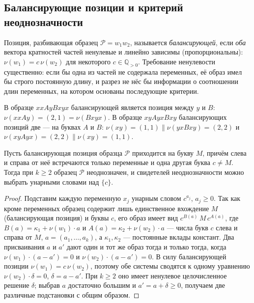 \documentclass[14pt, russian]{scrartcl}
\begin{document}
\subsection{Балансирующие позиции и критерий неоднозначности}
\label{sec:balancing}

\begin{Definition}
Позиция, разбивающая образец $\mathcal{P} = w_1 w_2$, называется
\textit{балансирующей}, если \textit{оба} вектора кратностей частей ненулевые и линейно
зависимы (пропорциональны): $\nu(w_1) = c\,\nu(w_2)$ для некоторого $c \in \mathbb{Q}_{> 0}$.
Требование ненулевости существенно: если бы одна из частей не содержала переменных, её
образ имел бы строго постоянную длину, и разрез не нёс бы информации о соотношении длин
переменных, на котором основаны последующие критерии.
\end{Definition}

\begin{Example}
В образце $x x A y B x y x$ балансирующей является позиция между $y$ и $B$:
$\nu(xxAy) = (2,1) = \nu(Bxyx)$. В образце $x y A y x B x y$ балансирующих позиций
две --- на буквах $A$ и $B$: $\nu(xy) = (1,1) \parallel \nu(yxBxy) = (2,2)$ и
$\nu(xyAyx) = (2,2) \parallel \nu(xy) = (1,1)$.
\end{Example}

\begin{Lemma}
\label{lem:unary}
Пусть балансирующая позиция образца $\mathcal{P}$ приходится на букву $M$, причём
слева и справа от неё встречаются только переменные и одна другая буква $c \neq M$.
Тогда при $k \ge 2$ образец $\mathcal{P}$ неоднозначен, и свидетелей неоднозначности
можно выбрать унарными словами над $\{c\}$.
\end{Lemma}

\begin{proof}
Подставим каждую переменную $x_j$ унарным словом $c^{a_j}$, $a_j \ge 0$. Так как
кроме переменных образец содержит лишь единственное вхождение $M$ (балансирующая
позиция) и буквы $c$, его образ имеет вид $c^{B(a)}\, M\, c^{A(a)}$, где
$B(a) = \kappa_1 + \nu(w_1)\cdot a$ и $A(a) = \kappa_2 + \nu(w_2)\cdot a$ --- числа
букв $c$ слева и справа от $M$, $a = (a_1, \dots, a_k)$, а $\kappa_1, \kappa_2$ ---
постоянные вклады констант. Два присваивания $a$ и $a'$ дают один и тот же образ
тогда и только тогда, когда $\nu(w_1)\cdot(a - a') = 0$ и $\nu(w_2)\cdot(a-a') = 0$.
В силу балансирующей позиции $\nu(w_1) = c\,\nu(w_2)$, поэтому обе системы сводятся к
одному уравнению $\nu(w_2)\cdot\delta = 0$, $\delta = a - a'$. При $k \ge 2$ оно имеет
ненулевое целочисленное решение $\delta$; выбрав $a$ достаточно большим и
$a' = a + \delta \ge 0$, получаем две различные подстановки с общим образом.
\end{proof}
\end{document}
